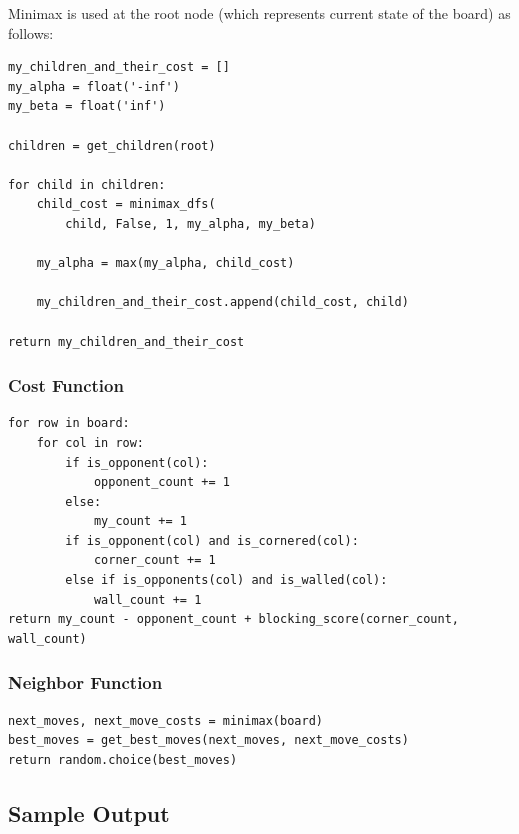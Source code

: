 \documentclass{article}
\begin{document}
Minimax is used at the root node (which represents current state of the board) as follows:

\begin{lstlisting}
my_children_and_their_cost = []
my_alpha = float('-inf')
my_beta = float('inf')

children = get_children(root)

for child in children:
    child_cost = minimax_dfs(
        child, False, 1, my_alpha, my_beta)

    my_alpha = max(my_alpha, child_cost)

    my_children_and_their_cost.append(child_cost, child)

return my_children_and_their_cost
\end{lstlisting}

\subsubsection{Cost Function}

\begin{lstlisting}
for row in board:
    for col in row:
        if is_opponent(col):
            opponent_count += 1
        else:
            my_count += 1
        if is_opponent(col) and is_cornered(col):
            corner_count += 1
        else if is_opponents(col) and is_walled(col):
            wall_count += 1
return my_count - opponent_count + blocking_score(corner_count, wall_count)
\end{lstlisting}

\subsubsection{Neighbor Function}

\begin{lstlisting}
next_moves, next_move_costs = minimax(board)
best_moves = get_best_moves(next_moves, next_move_costs)
return random.choice(best_moves)
\end{lstlisting}

\subsection{Sample Output}
\end{document}
